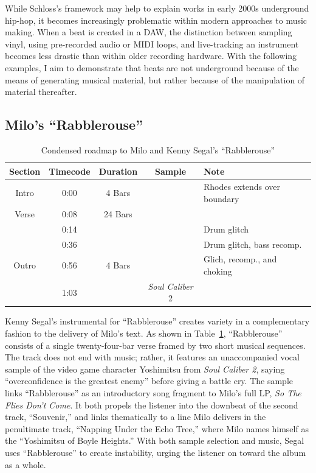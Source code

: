 While Schloss's framework may help to explain works in early 2000s underground hip-hop, it becomes
increasingly problematic within modern approaches to music making. When a beat is created in a DAW, 
the distinction between sampling vinyl, using pre-recorded audio or MIDI loops, and live-tracking an
instrument becomes less drastic than within older recording hardware. With the following examples, I aim
to demonstrate that beats are not underground because of the means of generating musical material, but 
rather because of the manipulation of material thereafter.

\subsection*{\centering Milo's ``Rabblerouse''}

\begin{table}[ht]
    \centering
        \begin{tabular}{|c|c|c|c|l|}
             \hline
            Section & Timecode & Duration & Sample                  & Note \\ \hline
            Intro   & 0:00     & 4 Bars   &                         & Rhodes extends over boundary \\ \hline
            Verse   & 0:08     & 24 Bars  &                         & \\ \hline
                    & 0:14     &          &                         & Drum glitch \\ \hline
                    & 0:36     &          &                         & Drum glitch, bass recomp. \\ \hline
            Outro   & 0:56     & 4 Bars   &                         & Glich, recomp., and choking \\ \hline
                    & 1:03     &          & \textit{Soul Caliber} 2 & \\ \hline
        \end{tabular}
    \caption{Condensed roadmap to Milo and Kenny Segal's ``Rabblerouse''}
    \label{tab:rabblerouse}
\end{table}

Kenny Segal's instrumental for ``Rabblerouse'' creates variety in a complementary fashion to the 
delivery of Milo's text. As shown in Table~\ref{tab:rabblerouse}, ``Rabblerouse'' consists of a single
twenty-four-bar verse framed by two short musical sequences. The track does not end with music; rather, 
it features an unaccompanied vocal sample of the video game character Yoshimitsu from \emph{Soul Caliber 2},
saying ``overconfidence is the greatest enemy'' before giving a battle cry. The sample links ``Rabblerouse''
as an introductory song fragment to Milo's full LP, \emph{So The Flies Don't Come}. It both propels the
listener into the downbeat of the second track, ``Souvenir,'' and links thematically to a line Milo 
delivers in the penultimate track, ``Napping Under the Echo Tree,'' where Milo names himself as the
``Yoshimitsu of Boyle Heights.'' With both sample selection and music, Segal uses ``Rabblerouse'' to 
create instability, urging the listener on toward the album as a whole.

